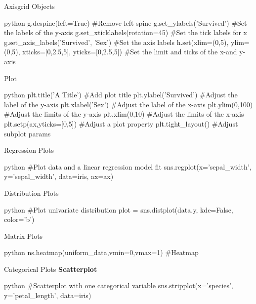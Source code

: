 \begin{myblock}{}
\begin{myblock}{Axisgrid Objects}
\begin{codebox}{python}{}
g.despine(left=True)  #Remove left spine
g.set_ylabels('Survived')  #Set the labels of the y-axis
g.set_xticklabels(rotation=45)  #Set the tick labels for x
g.set_axis_labels('Survived',
                  'Sex')  #Set the axis labels
h.set(xlim=(0,5),
      ylim=(0,5),
      xticks=[0,2.5,5],
      yticks=[0,2.5,5])  #Set the limit and ticks of the x-and y-axis
\end{codebox}

\end{myblock}
\begin{myblock}{Plot}
\begin{codebox}{python}{}
plt.title('A Title')  #Add plot title
plt.ylabel('Survived')  #Adjust the label of the y-axis
plt.xlabel('Sex')  #Adjust the label of the x-axis
plt.ylim(0,100)  #Adjust the limits of the y-axis
plt.xlim(0,10)  #Adjust the limits of the x-axis
plt.setp(ax,yticks=[0,5])  #Adjust a plot property
plt.tight_layout()  #Adjust subplot params
\end{codebox}

\end{myblock}
\begin{myblock}{Regression Plots}
\begin{codebox}{python}{}
#Plot data and a linear regression model fit
sns.regplot(x='sepal_width',
            y='sepal_width',
            data=iris,
            ax=ax)
\end{codebox}

\end{myblock}
\begin{myblock}{Distribution Plots}
\begin{codebox}{python}{}
#Plot univariate distribution
plot = sns.distplot(data.y,
                    kde=False,
                    color='b')
\end{codebox}

\end{myblock}
\begin{myblock}{Matrix Plots}
\begin{codebox}{python}{}
ns.heatmap(uniform_data,vmin=0,vmax=1)  #Heatmap
\end{codebox}

\end{myblock}
\begin{myblock}{Categorical Plots}
\textbf{Scatterplot}
\begin{codebox}{python}{}
#Scatterplot with one categorical variable
sns.stripplot(x='species',
              y='petal_length',
              data=iris)


\end{codebox}
\end{myblock}
\end{myblock}
